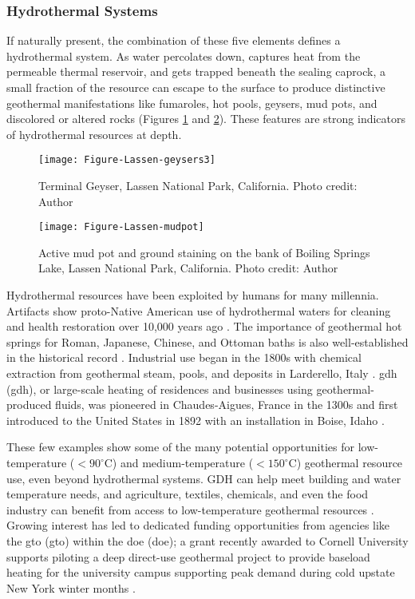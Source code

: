 \subsubsection{Hydrothermal Systems}\label{ch2:hydro}
If naturally present, the combination of these five elements defines a hydrothermal system. As water percolates down, captures heat from the permeable thermal reservoir, and gets trapped beneath the sealing caprock, a small fraction of the resource can escape to the surface to produce distinctive geothermal manifestations like fumaroles, hot pools, geysers, mud pots, and discolored or altered rocks (Figures \ref{fig:lassen-geysers} and \ref{fig:lassen-mudpot}). These features are strong indicators of hydrothermal resources at depth.
\begin{figure}[h!]
\centering
\texttt{[image: Figure-Lassen-geysers3]}
\caption[Terminal Geyser, Lassen National Park]{Terminal Geyser, Lassen National Park, California. Photo credit: Author}
\label{fig:lassen-geysers}
\end{figure}
\begin{figure}[htbp]
\centering
\texttt{[image: Figure-Lassen-mudpot]}
\caption[Mud pot, Lassen National Park]{Active mud pot and ground staining on the bank of Boiling Springs Lake, Lassen National Park, California. Photo credit: Author}
\label{fig:lassen-mudpot}
\end{figure}

Hydrothermal resources have been exploited by humans for many millennia. Artifacts show proto-Native American use of hydrothermal waters for cleaning and health restoration over 10,000 years ago \citep{doe_history_2021}. The importance of geothermal hot springs for Roman, Japanese, Chinese, and Ottoman baths is also well-established in the historical record \citep{lund_characteristics_2007}. Industrial use began in the 1800s with chemical extraction from geothermal steam, pools, and deposits in Larderello, Italy \citep[~p. 251]{dipippo_geothermal_2012}. \acrlong{gdh} (\acrshort{gdh}), or large-scale heating of residences and businesses using geothermal-produced fluids, was pioneered in Chaudes-Aigues, France in the 1300s and first introduced to the United States in 1892 with an installation in Boise, Idaho \citep{lund_characteristics_2007}.

These few examples show some of the many potential opportunities for low-temperature ($<90^\circ$C) and medium-temperature ($<150^\circ$C) geothermal resource use, even beyond hydrothermal systems. GDH can help meet building and water temperature needs, and agriculture, textiles, chemicals, and even the food industry can benefit from access to low-temperature geothermal resources \citep{doe_low_2021, liu_overview_2015}. Growing interest has led to dedicated funding opportunities from agencies like the \acrlong{gto} (\acrshort{gto}) within the \acrlong{doe} (\acrshort{doe}); a grant recently awarded to Cornell University supports piloting a deep direct-use geothermal project to provide baseload heating for the university campus supporting peak demand during cold upstate New York winter months  \citep{hamm_geothermal_2021,tester_integrating_2015}.

